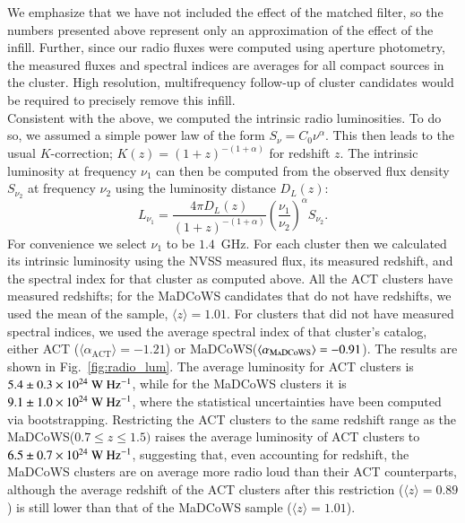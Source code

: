 \documentclass[longauth]{aa} %
\newcommand{\madcows}{MaDCoWS\xspace}
\begin{document}
We emphasize that we have not included the effect of the matched filter, so the numbers presented above represent only an approximation of the effect of the infill. Further, since our radio fluxes were computed using aperture photometry, the measured fluxes and spectral indices are averages for all compact sources in the cluster. High resolution, multifrequency follow-up of cluster candidates would be required to precisely remove this infill.
\\

Consistent with the above, we computed the intrinsic radio luminosities. To do so, we assumed a simple power law of the form $S_{\nu} = C_0\nu^{\alpha}$. This then leads to the usual $K$-correction; $K(z)= (1+z)^{-(1+\alpha)}$ for redshift $z$. The intrinsic luminosity at frequency $\nu_1$ can then be computed from the observed flux density $S_{\nu_2}$ at frequency $\nu_2$ using the luminosity distance $D_L(z)$:
\begin{equation} \label{eq:8}
    L_{\nu_1} = \frac{4\pi D_L(z)}{(1+z)^{-(1+\alpha)}}\left( \frac{\nu_1}{\nu_2}\right)^{\alpha} S_{\nu_2}
.\end{equation}
For convenience we select $\nu_1$ to be $1.4$~GHz. For each cluster then we calculated its intrinsic luminosity using the NVSS measured flux, its measured redshift, and the spectral index for that cluster as computed above. All the ACT clusters have measured redshifts; for the \madcows candidates that do not have redshifts, we used the mean of the sample, $\langle z \rangle=1.01$. For clusters that did not have measured spectral indices, we used the average spectral index of that cluster's catalog, either ACT ($\langle \alpha_\text{ACT} \rangle = -1.21$) or \madcows ($\langle \alpha_\textsc{\madcows} \rangle = -0.91$). The results are shown in Fig.~\ref{fig:radio_lum}. The average luminosity for ACT clusters is $5.4\pm 0.3 \times 10^{24}~\textsc{W Hz}^{-1}$, while for the \madcows clusters it is $9.1\pm 1.0 \times 10^{24}~\textsc{W Hz}^{-1}$, where the statistical uncertainties have been computed via bootstrapping. Restricting the ACT clusters to the same redshift range as the \madcows ($0.7\leq z \leq 1.5)$ raises the average luminosity of ACT clusters to $6.5 \pm 0.7 \times 10^{24}~\textsc{W Hz}^{-1}$, suggesting that, even accounting for redshift, the \madcows clusters are on average more radio loud than their ACT counterparts, although the average redshift of the ACT clusters after this restriction ($\langle z \rangle =0.89$) is still lower than that of the \madcows sample ($\langle z\rangle = 1.01$). 
\end{document}
